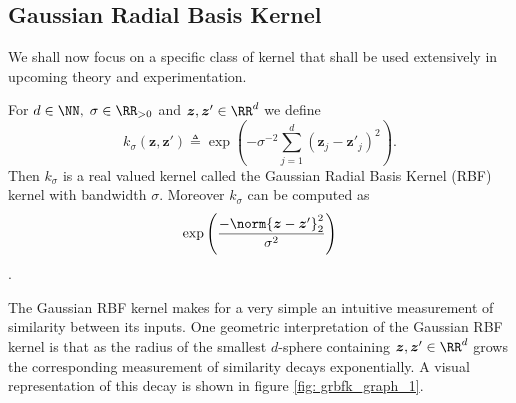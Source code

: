\subsection{Gaussian Radial Basis Kernel}\label{Section1.3}

We shall now focus on a specific class of kernel that shall be used extensively in upcoming theory and experimentation.

\begin{defe} \label{defe: grbfk}
    For $d \in \NN, \; \sigma \in \RR_{>0}$ and $ \bm{z} , \bm{z}' \in \RR^d$ we define
    \[
        k_\sigma \left( \bm{z} , \bm{z}' \right) \triangleq \exp \left( - \sigma^{-2} \sum_{j=1}^{d} \left( \bm{z}_j - {\bm{z}'}_j \right)^2 \right).
    \]
    Then $k_\sigma$ is a real valued kernel called the Gaussian Radial Basis Kernel (RBF) kernel with bandwidth $\sigma$. Moreover $k_\sigma$ can be computed as
    \[
        \exp \left( \frac{- \norm{\bm{z} - {\bm{z}'}}_{2}^{2}}{\sigma^2} \right)
    \]
    \cite{SteinwartIngo2008SVMb}.
\end{defe}
The Gaussian RBF kernel makes for a very simple an intuitive measurement of similarity between its inputs. One geometric interpretation of the Gaussian RBF kernel is that as the radius of the smallest $d$-sphere containing $\bm{z} , \bm{z}' \in \RR^d$ grows the corresponding measurement of similarity decays exponentially. A visual representation of this decay is shown in figure \ref{fig: grbfk_graph_1}.

